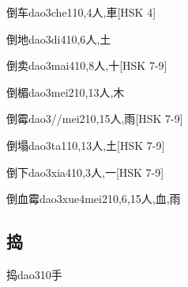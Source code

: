 \begin{EntryWithPhonetic}{倒车}{dao3che1}{10,4}{⼈,⾞}[HSK 4]
\end{EntryWithPhonetic}

\begin{EntryWithPhonetic}{倒地}{dao3di4}{10,6}{⼈,⼟}
\end{EntryWithPhonetic}

\begin{EntryWithPhonetic}{倒卖}{dao3mai4}{10,8}{⼈,⼗}[HSK 7-9]
\end{EntryWithPhonetic}

\begin{EntryWithPhonetic}{倒楣}{dao3mei2}{10,13}{⼈,⽊}
\end{EntryWithPhonetic}

\begin{EntryWithPhonetic}{倒霉}{dao3//mei2}{10,15}{⼈,⾬}[HSK 7-9]
\end{EntryWithPhonetic}

\begin{EntryWithPhonetic}{倒塌}{dao3ta1}{10,13}{⼈,⼟}[HSK 7-9]
\end{EntryWithPhonetic}

\begin{EntryWithPhonetic}{倒下}{dao3xia4}{10,3}{⼈,⼀}[HSK 7-9]
\end{EntryWithPhonetic}

\begin{EntryWithPhonetic}{倒血霉}{dao3xue4mei2}{10,6,15}{⼈,⾎,⾬}
\end{EntryWithPhonetic}

\subsection*{捣}

\begin{EntryWithPhonetic}{捣}{dao3}{10}{⼿}
\end{EntryWithPhonetic}

